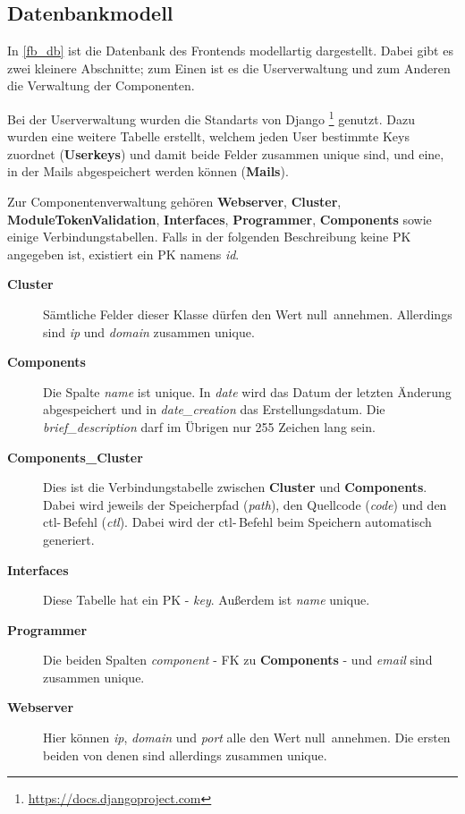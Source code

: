 \subsection{Datenbankmodell}


In \ref{fb_db} ist die Datenbank des Frontends modellartig dargestellt. Dabei
gibt es zwei kleinere Abschnitte; zum Einen ist es die Userverwaltung und zum
Anderen die Verwaltung der Componenten. 

Bei der Userverwaltung wurden die Standarts von Django
\footnote{\url{https://docs.djangoproject.com}} genutzt. Dazu wurden eine
weitere Tabelle erstellt, welchem jeden User bestimmte Keys zuordnet
(\textbf{Userkeys}) und damit beide Felder zusammen unique sind, und eine, in 
der Mails abgespeichert werden können (\textbf{Mails}).

Zur Componentenverwaltung gehören \textbf{Webserver}, \textbf{Cluster},
\textbf{ModuleTokenValidation}, \textbf{Interfaces}, \textbf{Programmer}, 
\textbf{Components} sowie einige Verbindungstabellen.
Falls in der folgenden Beschreibung keine PK angegeben ist, existiert ein PK
namens \textit{id}. 

\begin{description}
  \item[\textbf{Cluster}]
	Sämtliche Felder dieser Klasse dürfen den Wert \glqq null\grqq\ annehmen.
	Allerdings sind \textit{ip} und \textit{domain} zusammen unique.
  \item[\textbf{Components}]
	Die Spalte \textit{name} ist unique. In \textit{date} wird das Datum der
	letzten Änderung abgespeichert und in \textit{date\_creation} das
	Erstellungsdatum. Die \textit{brief\_description} darf im Übrigen nur 255
	Zeichen lang sein.
  \item[\textbf{Components\_Cluster}]
	Dies ist die Verbindungstabelle zwischen \textbf{Cluster} und
	\textbf{Compo\-nents}. Dabei wird jeweils der Speicherpfad (\textit{path}),
	den Quellcode (\textit{code}) und den ctl-\,Befehl (\textit{ctl}). Dabei
	wird der ctl-\,Befehl beim Speichern automatisch generiert.
  \item[\textbf{Interfaces}]
	Diese Tabelle hat ein PK - \textit{key}. Außerdem ist \textit{name} unique.
  \item[\textbf{Programmer}]
	Die beiden Spalten \textit{component} - FK zu \textbf{Components} - und
	\textit{email} sind zusammen unique. 
  \item[\textbf{Webserver}]
	Hier können \textit{ip}, \textit{domain} und \textit{port} alle den Wert
	\glqq null\grqq\ annehmen. Die ersten beiden von denen sind allerdings
	zusammen unique.
\end{description}

